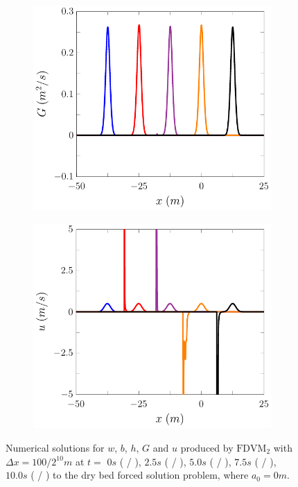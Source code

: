 \begin{figure}
\begin{subfigure}{0.5\textwidth}
		\vspace{0.5cm}
	\end{subfigure}
	\begin{subfigure}{0.5\textwidth}
		\includegraphics[width=\textwidth]{./chp5/figures/Forced/Dry/FDVMG.pdf}
	\end{subfigure}%
	\begin{subfigure}{0.5\textwidth}
		\includegraphics[width=\textwidth]{./chp5/figures/Forced/Dry/FDVMu.pdf}
	\end{subfigure}
	\caption{Numerical solutions for $w$, $b$, $h$, $G$ and $u$ produced by $\text{FDVM}_2$ with $\Delta x = 100 / 2^{10}m$ at $t=$ $0s$ ({\color{blue} \solidrule} /  ), $2.5s$ ({\color{red} \solidrule}/ ), $5.0s$ ({\color{violet!80!white} \solidrule} / ), $7.5s$ ({\color{orange} \solidrule}/ ), $10.0s$ ({\color{black} \solidrule} / ) to the dry bed forced solution problem, where $a_0 = 0m$.}
	\label{fig:ForcedFDVMP2PExAll}
\end{figure}

